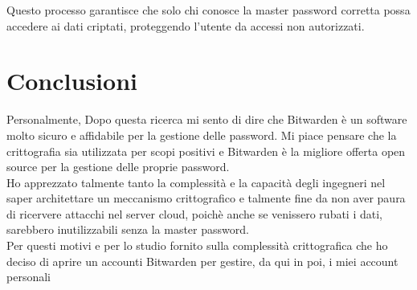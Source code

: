 \documentclass[a4paper,12pt]{report}
\begin{document}
				Questo processo garantisce che solo chi conosce la master password corretta possa accedere ai dati criptati, proteggendo l'utente da accessi non autorizzati.
			\chapter{Conclusioni}
			Personalmente, Dopo questa ricerca mi sento di dire che Bitwarden è un
			software molto sicuro e affidabile per la gestione delle password.
			Mi piace pensare che la crittografia sia utilizzata per scopi positivi
			e Bitwarden è la migliore offerta open source per la gestione delle
			proprie password.\\
			Ho apprezzato talmente tanto la complessità e la capacità degli ingegneri
			nel saper architettare un meccanismo crittografico e talmente fine da non 
			aver paura di ricervere attacchi nel server cloud, poichè anche se venissero 
			rubati i dati, sarebbero inutilizzabili senza la master password.\\ Per questi 
			motivi e per lo studio fornito sulla complessità crittografica che ho deciso 
			di aprire un accounti Bitwarden per gestire, da qui in poi, i miei account personali \\
			
			\renewcommand{\bibsection}{}
			
	
\end{document}

